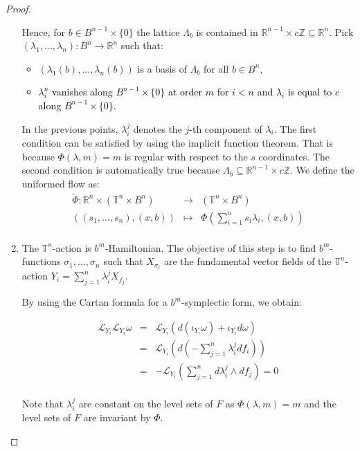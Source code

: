 \begin{proof}
\begin{enumerate}
Hence, for $b\in B^{n-1}\times\{0\}$ the lattice $\Lambda_b$ is contained in $\mathbb{R}^{n-1}\times c \mathbb{Z} \subseteq \mathbb{R}^n$.
Pick $(\lambda_1,\ldots,\lambda_n): B^n\rightarrow \mathbb{R}^n$ such that:
\begin{itemize}%
\item $(\lambda_1(b),\ldots,\lambda_n(b))$ is a basis of $\Lambda_b$ for all $b\in B^n$,
\item \textcolor{black}{$\lambda_i^n$ vanishes along $B^{n-1}\times\{0\}$ at order $m$ for $i<n$ and $\lambda_i$ is equal to $c$ along $B^{n-1}\times\{0\}$.}
\end{itemize}
In the previous points, $\lambda_i^j$ denotes the $j$-th component of $\lambda_i$. The first condition can be satisfied by using the implicit function theorem. That is because $\Phi(\lambda,m) = m$ is regular with respect to the $s$ coordinates. The second condition is automatically true because $\Lambda_b \subseteq \mathbb{R}^{n-1}\times c\mathbb{Z}$. We define the uniformed flow as:
\begin{equation}\label{eq:action2}
\begin{array}{rcl}
\tilde \Phi: \mathbb{R}^n\times(\mathbb{T}^n\times B^n)& \rightarrow & (\mathbb{T}^n\times B^n)\\
((s_1,\ldots,s_n),(x,b))& \mapsto & \Phi(\sum_{i=1}^n s_i \lambda_i,(x,b))\\

\end{array}
\end{equation}
\item The $\mathbb{T}^n$-action is $b^m$-Hamiltonian.
The objective of this step is to find $b^m$-functions $\sigma_1,\ldots,\sigma_n$ such that $X_{\sigma_i}$ are the fundamental vector fields of the $\mathbb{T}^n$-action $Y_i = \sum_{j=1}^n \lambda_i^j X_{f_j}$.

By using the Cartan formula for a $b^m$-symplectic form, we obtain:

$$
\begin{array}{rcl}
\mathcal{L}_{Y_i}\mathcal{L}_{Y_i}\omega & = & \mathcal{L}_{Y_i}(d(\iota_{Y_i}\omega) + \iota_{Y_i}d\omega)\\
 & = &  \mathcal{L}_{Y_i}(d(-\sum_{j=1}^{n} \lambda_i^j df_i))\\
 & = &  -\mathcal{L}_{Y_i}(\sum_{j=1}^n d\lambda_i^j\wedge df_j) = 0\\
\end{array}
$$

Note that $\lambda_i^j$ are constant on the level sets of $F$ as $\Phi(\lambda, m) = m$  and the level sets of $F$ are invariant by $\Phi$.


\end{enumerate}
\end{proof}
